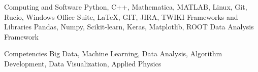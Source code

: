 
\begin{cvskills}
  \cvskill
    {Computing and Software} %
    {Python, C++, Mathematica, MATLAB, Linux, Git, Rucio, Windows Office Suite, \LaTeX, GIT, JIRA, TWIKI} %
     \cvskill
    {Frameworks and Libraries} %
    {Pandas, Numpy, Scikit-learn, Keras, Matplotlib, ROOT Data Analysis Framework} %


  \cvskill
    {Competencies} %
    {Big Data, Machine Learning, Data Analysis, Algorithm Development, Data Visualization, Applied Physics} %

\end{cvskills}

